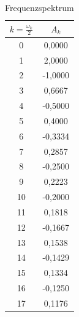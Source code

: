 \documentclass[titlepage = firstcover]{scrartcl}
\begin{document}
    \begin{table}[h]
        \centering
        \caption{Frequenzspektrum}
        \label{tab:Tabelle_1}
        
        \begin{tabular}{c c}
            \toprule
            {$k = \frac{\omega_k}{2}$} & {$A_k$}\\
            \midrule
            0 &  0,0000 \\
            1 & 2,0000  \\
            2 & -1,0000 \\
            3 & 0,6667  \\
            4 & -0,5000 \\
            5 & 0,4000  \\
            6 & -0,3334 \\
            7 & 0,2857  \\
            8 & -0,2500 \\
            9 & 0,2223  \\
            10 & -0,2000    \\
            11 & 0,1818 \\
            12 & -0,1667 \\
            13 & 0,1538 \\
            14 & -0,1429 \\
            15 & 0,1334 \\
            16 & -0,1250 \\
            17 & 0,1176 \\
            \bottomrule
        \end{tabular}    
    \end{table}
\end{document}
